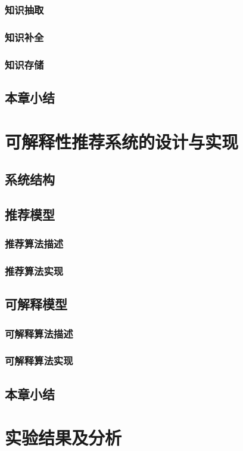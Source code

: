 \subsection{知识抽取}
\subsection{知识补全}
\subsection{知识存储}
\section{本章小结}

\chapter{可解释性推荐系统的设计与实现}
\section{系统结构}
\section{推荐模型}
\subsection{推荐算法描述}
\subsection{推荐算法实现}
\section{可解释模型}
\subsection{可解释算法描述}
\subsection{可解释算法实现}
\section{本章小结}

\chapter{实验结果及分析}
